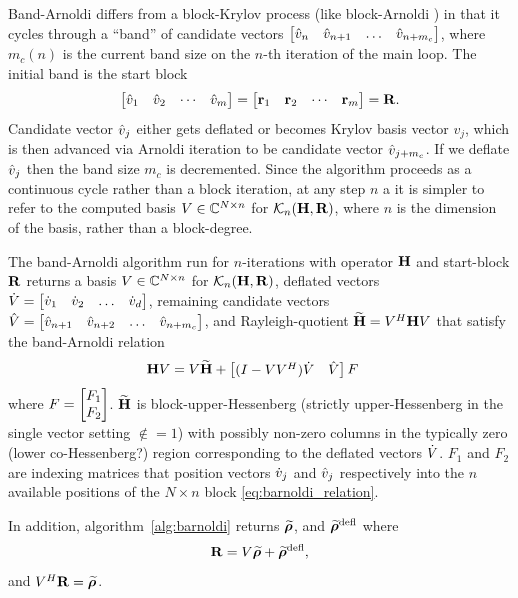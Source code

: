 Band-Arnoldi differs from a block-Krylov process (like block-Arnoldi \cite{lehoucq1997block}) in that it cycles through a ``band'' of candidate vectors  $\begin{bmatrix} \hat{v}_n&\hat{v}_{n+1} &\ldots&\hat{v}_{n+ m_c}\end{bmatrix}$, where $m_c(n)$ is the current band size on the $n$-th iteration of the main loop. The initial band  is the start block
\[
\begin{bmatrix} \hat{v}_1&\hat{v}_2&\cdots&\hat{v}_m\end{bmatrix} = \begin{bmatrix} \textbf{\textup{r}}_1&\textbf{\textup{r}}_2&\cdots&\textbf{\textup{r}}_m\end{bmatrix} = \textbf{\textup{R}}.
\]
 Candidate vector $\hat{v}_j$ either gets deflated or becomes Krylov basis vector $v_j$, which is then advanced via Arnoldi iteration to be candidate vector $\hat{v}_{j+m_c}$.  If  we deflate  $\hat{v}_j$  then the band size $m_c$ is decremented.   Since the algorithm proceeds as a continuous cycle rather than a block iteration, at any step $n$ a it is simpler to refer to the computed basis $V\in\mathbb{C}^{N\times n}$ for $\mathcal{K}_{n}({\textbf{\textup{H}}},{\textbf{\textup{R}}})$, where $n$ is the dimension of the basis, rather than a block-degree.  

The band-Arnoldi algorithm run for $n$-iterations with operator $\textbf{\textup{H}}$ and start-block $\textbf{\textup{R}}$ returns a basis $V\in\mathbb{C}^{N\times n}$ for    $\mathcal{K}_{n}({\textbf{\textup{H}}},{\textbf{\textup{R}}})$, deflated vectors $\dot{V}=\begin{bmatrix} \dot{v}_1&\dot{v}_2&\ldots&\dot{v}_d\end{bmatrix}$, remaining candidate vectors $\hat{V}=\begin{bmatrix} \hat{v}_{n+1}&\hat{v}_{n+2} &\ldots&\hat{v}_{n+m_c}\end{bmatrix}$, and Rayleigh-quotient $\widetilde{\textbf{\textup{H}}}=V^H\textbf{\textup{H}} V$ that satisfy the band-Arnoldi relation 
\begin{equation}
\begin{aligned}
\textbf{\textup{H}} V &=  V \widetilde{\textbf{\textup{H}}} + \begin{bmatrix} (I-VV^H) \dot{V}  &  \hat{V}\end{bmatrix}F
\end{aligned}
\label{eq:barnoldi_relation}
\end{equation}
where  $F=\begin{bmatrix} F_1\\F_2\end{bmatrix}$.  
$\widetilde{\textbf{\textup{H}}}$ is block-upper-Hessenberg (strictly upper-Hessenberg in the single vector setting $\nin=1$) with possibly non-zero columns in the typically zero (lower co-Hessenberg?) region corresponding to the deflated vectors $\dot{V}$.     $F_1$ and $F_2$ are indexing matrices that position vectors $\dot{v}_j$ and $\hat{v}_j$ respectively into the $n$ available positions of the $N\times n$ block \eqref{eq:barnoldi_relation}.  

In addition, algorithm~\ref{alg:barnoldi} returns $\widetilde{\boldsymbol{\rho}}$, and $\widetilde{\boldsymbol{\rho}}^{\text{defl}}$ where
\begin{equation}
\textbf{\textup{R}} = V \widetilde{\boldsymbol{\rho}} + \widetilde{\boldsymbol{\rho}}^{\text{defl}},
\label{eq:barnoldi_rho_relation}
\end{equation}
and $V^H\textbf{\textup{R}} = \widetilde{\boldsymbol{\rho}}$.  

